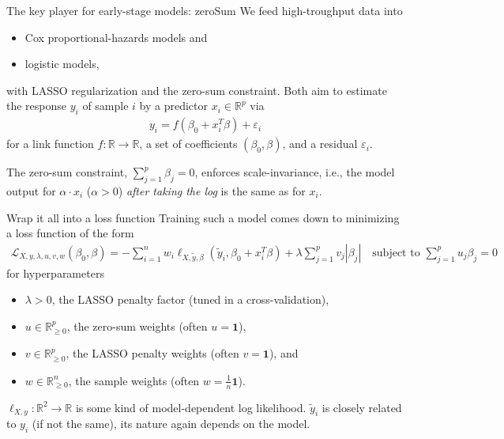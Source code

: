 \documentclass[10pt, aspectratio=169]{beamer}
\def\RR{\mathbb{R}}
\begin{document}
\begin{frame}{The key player for early-stage models: zeroSum}
  We feed high-troughput data into 

  \begin{itemize}
    \item \alert{Cox} proportional-hazards models and
    \item \alert{logistic} models,
  \end{itemize}

  with \alert{LASSO} regularization and the \alert{zero-sum} constraint. Both  
  aim to estimate the response $y_i$ of sample $i$ by a predictor $x_i \in \mathbb{R}^p$ via 
  \begin{align}
    y_i = f(\beta_0 + x_i^T \beta) + \varepsilon_i
  \end{align}
  for a link function $f: \mathbb{R} \to \mathbb{R}$, a set of coefficients $(\beta_0, 
  \beta)$, and a residual $\varepsilon_i$.

  The zero-sum constraint, $\sum_{j=1}^p \beta_j = 0$, enforces \alert{scale-invariance}, i.e., 
  the model output for $\alpha \cdot x_i$ ($\alpha > 0$) \textit{after taking the log} is the same 
  as for $x_i$.
\end{frame}

\begin{frame}{Wrap it all into a loss function}
  Training such a model comes down to minimizing a loss function of the form 
  \begin{align}
    \mathcal{L}_{X, y, \lambda, u, v, w}(\beta_0, \beta) = -\sum_{i=1}^n w_i 
    \ell_{X, \tilde{y}, \beta}(\tilde{y}_i, \beta_0 + x_i^T \beta) + \lambda \sum_{j=1}^p v_j |\beta_j| 
    \quad \text{subject to } \sum_{j=1}^p u_j \beta_j = 0
  \end{align}
  for hyperparameters 
  \begin{itemize}
    \item $\lambda > 0$, the LASSO penalty factor (tuned in a cross-validation),
    \item $u \in \RR^p_{\geq 0}$, the zero-sum weights (often $u = \mathbf{1}$),
    \item $v \in \RR^p_{\geq 0}$, the LASSO penalty weights (often $v = \mathbf{1}$), and
    \item $w \in \RR^n_{\geq 0}$, the sample weights (often $w = \frac{1}{n} \mathbf{1}$).
  \end{itemize}

  $\ell_{X, y}: \RR^2 \to \RR$ is some kind of model-dependent log likelihood. $\tilde{y}_i$ 
  is closely related to $y_i$ (if not the same), its nature again depends on the model.
\end{frame}
\end{document}
